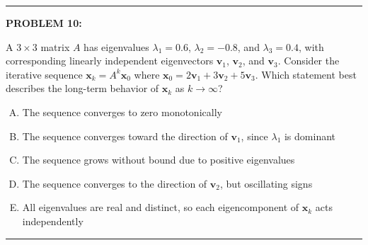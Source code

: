 \documentclass[12pt]{amsart}
\newcommand{\divider}{
  \vspace{-1em} %
  \noindent
  \raisebox{-0.15ex}{\textbullet}%
  \hspace{0.5em}%
  \rule[0.5ex]{0.95\textwidth}{1.0pt}%
  \hspace{0.5em}%
  \raisebox{-0.15ex}{\textbullet}%
  \vspace{0em} %
}
\begin{document}
\divider
\newpage

{\bf PROBLEM 10:}

A $3 \times 3$ matrix $A$ has eigenvalues $\lambda_1 = 0.6$, $\lambda_2 = -0.8$, and $\lambda_3 = 0.4$, with corresponding linearly independent eigenvectors $\mathbf{v}_1$, $\mathbf{v}_2$, and $\mathbf{v}_3$.
%
Consider the iterative sequence $\mathbf{x}_k = A^k\mathbf{x}_0$ where $\mathbf{x}_0 = 2\mathbf{v}_1 + 3\mathbf{v}_2 + 5\mathbf{v}_3$.
%
Which statement best describes the long-term behavior of $\mathbf{x}_k$ as $k \to \infty$?

\begin{enumerate}[(A)]
\item The sequence converges to zero monotonically
\item The sequence converges toward the direction of $\mathbf{v}_1$, since $\lambda_1$ is dominant
\item The sequence grows without bound due to positive eigenvalues
\item The sequence converges to the direction of $\mathbf{v}_2$, but oscillating signs%
\item All eigenvalues are real and distinct, so each eigencomponent of $\mathbf{x}_k$ acts independently
\end{enumerate}

\divider 
\end{document}
